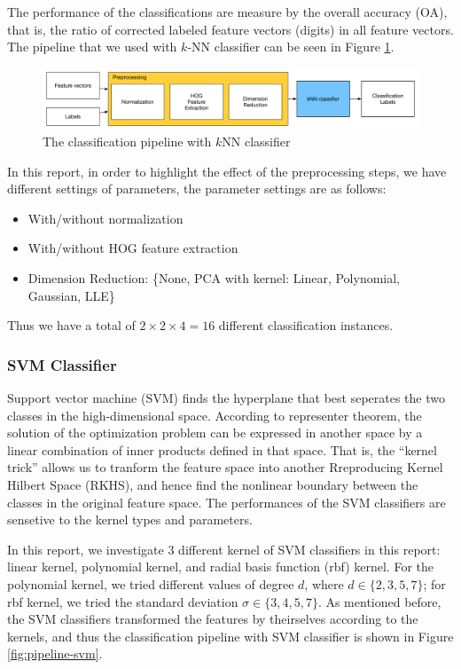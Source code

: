 \documentclass[12pt]{article}
\begin{document}
The performance of the classifications are measure by the overall accuracy (OA), that is, the ratio of corrected labeled feature vectors (digits) in all feature vectors. The pipeline that we used with $k$-NN classifier can be seen in Figure \ref{fig:pipeline-knn}.

\begin{figure}[tbp]
	\centering
	\includegraphics[width =\textwidth]{pipeline-knn}		
	\caption{The classification pipeline with $k$NN classifier}
	\label{fig:pipeline-knn}
\end{figure}

In this report, in order to highlight the effect of the preprocessing steps, we have different settings of parameters, the parameter settings are as follows:
\begin{itemize}
	\item With/without normalization
	\item With/without HOG feature extraction
	\item Dimension Reduction: \{None, PCA with kernel: {Linear, Polynomial, Gaussian}, LLE\}
\end{itemize}
Thus we have a total of $2 \times 2 \times 4 = 16$ different classification instances.

\subsubsection{SVM Classifier}

Support vector machine (SVM)\cite{le1990handwritten, lecun1995comparison} finds the hyperplane that best seperates the two classes in the high-dimensional space. According to representer theorem, the solution of the optimization problem can be expressed in another space by a linear combination of inner products defined in that space. That is, the ``kernel trick'' allows us to tranform the feature space into another Rreproducing Kernel Hilbert Space (RKHS), and hence find the nonlinear boundary between the classes in the original feature space. The performances of the SVM classifiers are sensetive to the kernel types and parameters.

In this report, we investigate 3 different kernel of SVM classifiers in this report: linear kernel, polynomial kernel, and radial basis function (rbf) kernel. For the polynomial kernel, we tried different values of degree $d$, where $d \in \{2,3,5,7\}$; for rbf kernel, we tried the standard deviation $\sigma \in \{3, 4, 5, 7\}$. As mentioned before, the SVM classifiers transformed the features by theirselves according to the kernels, and thus the classification pipeline with SVM classifier is shown in Figure \ref{fig:pipeline-svm}.
\end{document}
